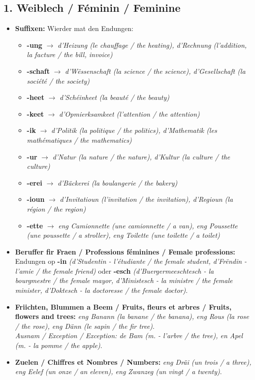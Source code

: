 \subsection*{1. Weiblech / Féminin / Feminine}
\begin{itemize}
    \item \textbf{Suffixen:} Wierder mat den Endungen:
        \begin{itemize}
            \item \textbf{-ung} $\rightarrow$ \textit{d'Heizung (le chauffage / the heating), d'Rechnung (l'addition, la facture / the bill, invoice)}
            \item \textbf{-schaft} $\rightarrow$ \textit{d'Wëssenschaft (la science / the science), d'Gesellschaft (la société / the society)}
            \item \textbf{-heet} $\rightarrow$ \textit{d'Schéinheet (la beauté / the beauty)}
            \item \textbf{-keet} $\rightarrow$ \textit{d'Opmierksamkeet (l'attention / the attention)}
            \item \textbf{-ik} $\rightarrow$ \textit{d'Politik (la politique / the politics), d'Mathematik (les mathématiques / the mathematics)}
            \item \textbf{-ur} $\rightarrow$ \textit{d'Natur (la nature / the nature), d'Kultur (la culture / the culture)}
            \item \textbf{-erei} $\rightarrow$ \textit{d'Bäckerei (la boulangerie / the bakery)}
            \item \textbf{-ioun} $\rightarrow$ \textit{d'Invitatioun (l'invitation / the invitation), d'Regioun (la région / the region)}
            \item \textbf{-ette} $\rightarrow$ \textit{eng Camionnette (une camionnette / a van), eng Poussette (une poussette / a stroller), eng Toilette (une toilette / a toilet)}
        \end{itemize}
    \item \textbf{Beruffer fir Fraen / Professions féminines / Female professions:} Endungen op \textbf{-in} \textit{(d'Studentin - l'étudiante / the female student, d'Frëndin - l'amie / the female friend)} oder \textbf{-esch} \textit{(d'Buergermeeschtesch - la bourgmestre / the female mayor, d'Ministesch - la ministre / the female minister, d'Doktesch - la doctoresse / the female doctor)}.
    \item \textbf{Friichten, Blummen a Beem / Fruits, fleurs et arbres / Fruits, flowers and trees:} \textit{eng Banann (la banane / the banana), eng Rous (la rose / the rose), eng Dänn (le sapin / the fir tree)}. \\ \textit{Ausnam / Exception / Exception: de Bam (m. - l'arbre / the tree), en Apel (m. - la pomme / the apple)}.
    \item \textbf{Zuelen / Chiffres et Nombres / Numbers:} \textit{eng Dräi (un trois / a three), eng Eelef (un onze / an eleven), eng Zwanzeg (un vingt / a twenty)}.
\end{itemize}

